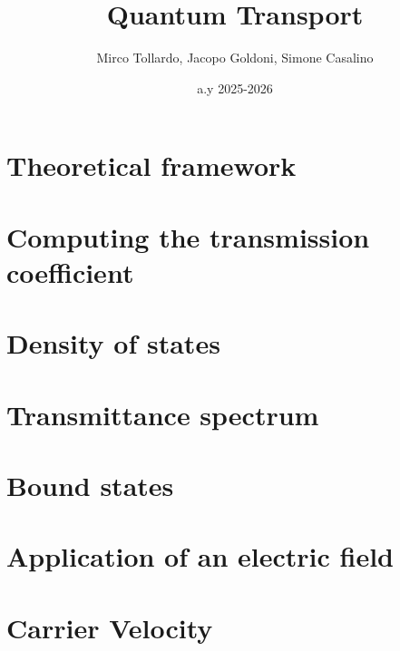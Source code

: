 \documentclass[a4paper,11pt]{beamer}
\title{Quantum Transport}
\author[Tollardo, Goldoni, Casalino]{Mirco Tollardo, Jacopo Goldoni, Simone Casalino}
\date{a.y 2025-2026}
\numberwithin{equation}{section}
\begin{document}
\maketitle

\tableofcontents
\newpage

\section{Theoretical framework}


\section{Computing the transmission coefficient}


\section{Density of states}


\section{Transmittance spectrum}


\section{Bound states}


\section{Application of an electric field}


\section{Carrier Velocity}

\end{document}
